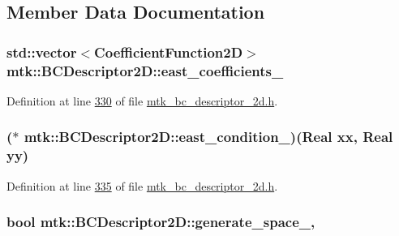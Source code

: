 \subsection{Member Data Documentation}
\hypertarget{classmtk_1_1BCDescriptor2D_a1f90fc303984bf18c136a34896bbb7c9}{
\subsubsection[{east\+\_\+coefficients\+\_\+}]{\setlength{\rightskip}{0pt plus 5cm}std\+::vector$<${\bf Coefficient\+Function2\+D}$>$ mtk\+::\+B\+C\+Descriptor2\+D\+::east\+\_\+coefficients\+\_\+\hspace{0.3cm}{\ttfamily [private]}}}\label{classmtk_1_1BCDescriptor2D_a1f90fc303984bf18c136a34896bbb7c9}


Definition at line \hyperlink{mtk__bc__descriptor__2d_8h_source_l00330}{330} of file \hyperlink{mtk__bc__descriptor__2d_8h_source}{mtk\+\_\+bc\+\_\+descriptor\+\_\+2d.\+h}.

\hypertarget{classmtk_1_1BCDescriptor2D_a6cca0c70293203c9d88773e5d5f93418}{
\subsubsection[{east\+\_\+condition\+\_\+}]{($\ast$ mtk\+::\+B\+C\+Descriptor2\+D\+::east\+\_\+condition\+\_\+)({\bf Real} xx, {\bf Real} yy)\hspace{0.3cm}{\ttfamily [private]}}}\label{classmtk_1_1BCDescriptor2D_a6cca0c70293203c9d88773e5d5f93418}


Definition at line \hyperlink{mtk__bc__descriptor__2d_8h_source_l00335}{335} of file \hyperlink{mtk__bc__descriptor__2d_8h_source}{mtk\+\_\+bc\+\_\+descriptor\+\_\+2d.\+h}.

\hypertarget{classmtk_1_1BCDescriptor2D_a3ef0bc7e9fbc16669099314dd34b170a}{
\subsubsection[{generate\+\_\+space\+\_\+}]{\setlength{\rightskip}{0pt plus 5cm}bool mtk\+::\+B\+C\+Descriptor2\+D\+::generate\+\_\+space\+\_\+\hspace{0.3cm}{\ttfamily [mutable]}, {\ttfamily [private]}}}\label{classmtk_1_1BCDescriptor2D_a3ef0bc7e9fbc16669099314dd34b170a}


